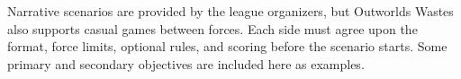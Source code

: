 Narrative scenarios are provided by the league organizers, but Outworlds Wastes also supports casual games between forces.
Each side must agree upon the format, force limits, optional rules, and scoring before the scenario starts.
Some primary and secondary objectives are included here as examples.
